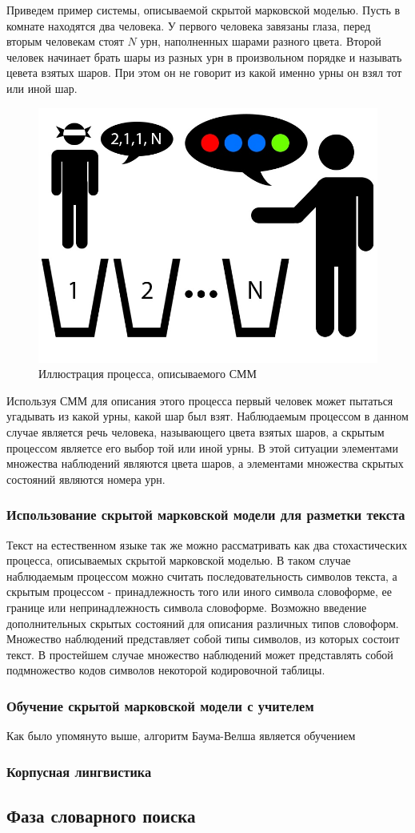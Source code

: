 Приведем пример системы, описываемой скрытой марковской моделью. Пусть в комнате находятся два человека. У первого человека завязаны глаза, перед вторым человекам стоят \(N\) урн, наполненных шарами разного цвета. Второй человек начинает брать шары из разных урн в произвольном порядке и называть цевета взятых шаров. При этом он не говорит из какой именно урны он взял тот или иной шар. 
\begin{figure}[H]
\centering
\includegraphics[scale=0.7]{img/hmm.jpg}
\caption{Иллюстрация процесса, описываемого СММ}
\end{figure}
Используя СММ для описания этого процесса первый человек может пытаться угадывать из какой урны, какой шар был взят. Наблюдаемым процессом в данном случае является речь человека, называющего цвета взятых шаров, а скрытым процессом являетсе его выбор той или иной урны. В этой ситуации элементами множества наблюдений являются цвета шаров, а элементами множества скрытых состояний являются номера урн.

\subsubsection{Использование скрытой марковской модели для разметки текста}
Текст на естественном языке так же можно рассматривать как два стохастических процесса, описываемых скрытой марковской моделью. В таком случае наблюдаемым процессом можно считать последовательность символов текста, а скрытым процессом - принадлежность того или иного символа словоформе, ее границе или непринадлежность символа словоформе. Возможно введение дополнительных скрытых состояний для описания различных типов словоформ. Множество наблюдений представляет собой типы символов, из которых состоит текст. В простейшем случае множество наблюдений может представлять собой подмножество кодов символов некоторой кодировочной таблицы. 

\subsubsection{Обучение скрытой марковской модели с учителем}
Как было упомянуто выше, алгоритм Баума-Велша является обучением 

\subsubsection{Корпусная лингвистика}

\subsection{Фаза словарного поиска}